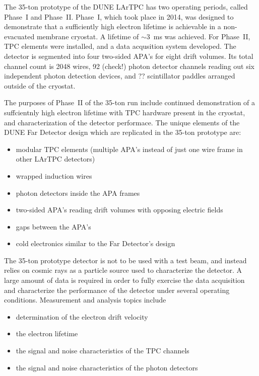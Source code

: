 \label{sec:35t}

The 35-ton prototype of the DUNE LArTPC has two operating periods, called Phase~I and Phase~II.  Phase~I, which took place
in 2014, was designed to demonstrate that a sufficiently high electron lifetime is achievable in a non-evacuated
membrane cryostat. A lifetime of $\sim$3~ms was achieved.  For Phase~II, TPC elements were installed, and
a data acqusition system developed.  The detector is segmented into four two-sided APA's for eight drift volumes.
Its total channel count is 2048 wires, 92 (check!) photon detector channels reading out six independent photon
detection devices, and ?? scintillator paddles arranged outside of the cryostat.

The purposes of Phase~II of the 35-ton run include continued demonstration of a suffcientnly high electron
lifetime with TPC hardware present in the cryostat, and characterization of the detector performace.
The unique elements of the DUNE Far Detector design which are replicated in the 35-ton
prototype are:
\begin{itemize}
\item  modular TPC elements (multiple APA's instead of just one wire frame in other LArTPC 
detectors)
\item wrapped induction wires
\item photon detectors inside the APA frames
\item two-sided APA's reading drift volumes with opposing electric fields
\item gaps between the APA's
\item cold electronics similar to the Far Detector's design
\end{itemize}

The 35-ton prototype detector is not to be used with a test beam, and instead relies on cosmic rays as
a particle source used to characterize the detector.  A large amount
of data is required in order to fully exercise the data acquisition and characterize the 
performance of the detector under several operating conditions.  Measurement and analysis topics include
\begin{itemize}
\item  determination of the electron drift velocity
\item the electron lifetime
\item the signal and noise characteristics of the TPC channels
\item the signal and noise characteristics of the photon detectors
\end{itemize}

